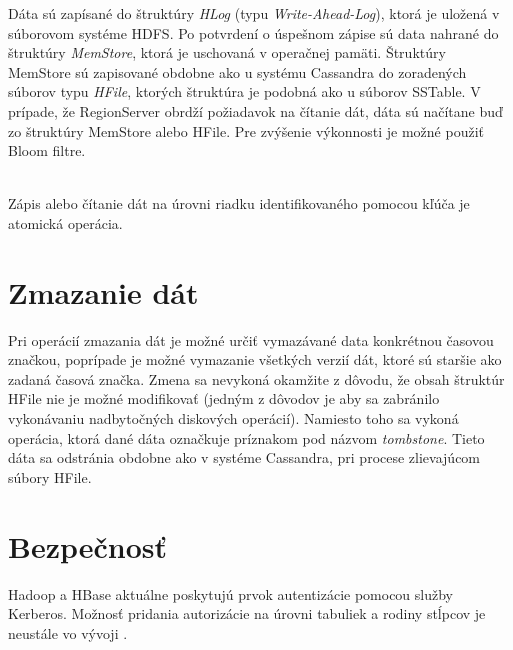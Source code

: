 \documentclass[11pt,twoside,a4paper]{book}
\begin{document}
Dáta sú zapísané do štruktúry \emph{HLog} (typu \emph{Write-Ahead-Log}), ktorá je uložená v súborovom systéme HDFS. Po potvrdení o úspešnom zápise sú data nahrané do štruktúry \emph{MemStore}, ktorá je uschovaná v operačnej pamäti. Štruktúry MemStore sú zapisované obdobne ako u systému Cassandra do zoradených súborov typu \emph{HFile}, ktorých štruktúra je podobná ako u súborov SSTable. 
\noindent
V  prípade, že RegionServer obrdží požiadavok na čítanie dát, dáta sú načítane buď zo štruktúry MemStore alebo HFile. Pre zvýšenie výkonnosti je možné použiť Bloom filtre.

% 
% 
\noindent
\\
Zápis alebo čítanie dát na úrovni riadku identifikovaného pomocou kľúča je atomická operácia. 


\section{Zmazanie dát}

Pri operácií zmazania dát je možné určiť vymazávané data konkrétnou časovou značkou, poprípade je možné vymazanie všetkých verzií dát, ktoré sú staršie ako zadaná časová značka. Zmena sa nevykoná okamžite z dôvodu, že obsah štruktúr HFile nie je možné modifikovať (jedným z dôvodov je aby sa zabránilo vykonávaniu nadbytočných diskových operácií). Namiesto toho sa vykoná operácia, ktorá dané dáta označkuje príznakom pod názvom \emph{tombstone}. Tieto dáta sa odstránia obdobne ako v systéme Cassandra, pri procese zlievajúcom súbory HFile.




\section{Bezpečnosť}

Hadoop a HBase aktuálne poskytujú prvok autentizácie pomocou služby Kerberos. Možnosť pridania autorizácie na úrovni tabuliek a rodiny stĺpcov je neustále vo vývoji \cite{hbaseSec}. 
\end{document}
